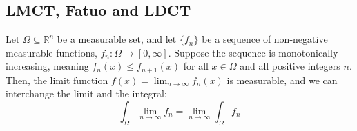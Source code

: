 \subsection{LMCT, Fatuo and LDCT}



\begin{theorem}
    Let $\Omega \subseteq \mathbb{R}^n$ be a measurable set, and let $\{f_n\}$ be a sequence of non-negative measurable functions, $f_n: \Omega \rightarrow [0, \infty]$. Suppose the sequence is monotonically increasing, meaning $f_n(x) \le f_{n+1}(x)$ for all $x \in \Omega$ and all positive integers $n$.
    Then, the limit function $f(x) = \displaystyle\lim_{n\to\infty} f_n(x)$ is measurable, and we can interchange the limit and the integral:
    $$ \int_\Omega \lim_{n\to\infty} f_n = \lim_{n\to\infty} \int_\Omega f_n $$
\end{theorem}

